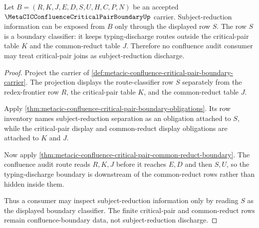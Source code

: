 \begin{theorem}
\label{thm:metacic-critical-pair-subject-reduction-separation}
Let $B=(R,K,J,E,D,S,U,H,C,P,N)$ be an accepted $\MetaCICConfluenceCriticalPairBoundaryUp$ carrier. Subject-reduction information can be exposed from $B$ only through the displayed row $S$. The row $S$ is a boundary classifier: it keeps typing-discharge routes outside the critical-pair table $K$ and the common-reduct table $J$. Therefore no confluence audit consumer may treat critical-pair joins as subject-reduction discharge.
\end{theorem}
\begin{proof}
Project the carrier of \autoref{def:metacic-confluence-critical-pair-boundary-carrier}. The projection displays the route-classifier row $S$ separately from the redex-frontier row $R$, the critical-pair table $K$, and the common-reduct table $J$.

Apply \autoref{thm:metacic-confluence-critical-pair-boundary-obligations}. Its row inventory names subject-reduction separation as an obligation attached to $S$, while the critical-pair display and common-reduct display obligations are attached to $K$ and $J$.

Now apply \autoref{thm:metacic-confluence-critical-pair-common-reduct-boundary}. The confluence audit route reads $R,K,J$ before it reaches $E,D$ and then $S,U$, so the typing-discharge boundary is downstream of the common-reduct rows rather than hidden inside them.

Thus a consumer may inspect subject-reduction information only by reading $S$ as the displayed boundary classifier. The finite critical-pair and common-reduct rows remain confluence-boundary data, not subject-reduction discharge.
\end{proof}

